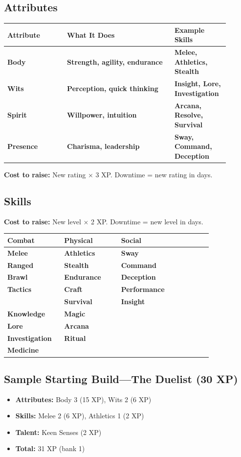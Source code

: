 \documentclass[10pt]{article}
\begin{document}
\subsection{Attributes}
\begin{coretable}[Attributes]
\begin{tabular}{>{\bfseries}p{0.25\linewidth} >{\bfseries}p{0.45\linewidth} >{\bfseries}p{0.2\linewidth}}
\toprule
\textbf{Attribute} & \textbf{What It Does} & \textbf{Example Skills} \\
\midrule
Body & Strength, agility, endurance & Melee, Athletics, Stealth \\
Wits & Perception, quick thinking & Insight, Lore, Investigation \\
Spirit & Willpower, intuition & Arcana, Resolve, Survival \\
Presence & Charisma, leadership & Sway, Command, Deception \\
\bottomrule
\end{tabular}
\end{coretable}
\textbf{Cost to raise:} New rating $\times$ 3 XP. Downtime = new rating in days.

\subsection{Skills}
\textbf{Cost to raise:} New level $\times$ 2 XP. Downtime = new level in days.
\begin{coretable}
\begin{tabular}{>{\bfseries}p{0.25\linewidth} >{\bfseries}p{0.25\linewidth} >{\bfseries}p{0.4\linewidth}}
\toprule
\textbf{Combat} & \textbf{Physical} & \textbf{Social} \\
\midrule
Melee & Athletics & Sway \\
Ranged & Stealth & Command \\
Brawl & Endurance & Deception \\
Tactics & Craft & Performance \\
& Survival & Insight \\
\addlinespace
\textbf{Knowledge} & \textbf{Magic} & \\
Lore & Arcana & \\
Investigation & Ritual & \\
Medicine & & \\
\bottomrule
\end{tabular}
\end{coretable}

\subsection{Sample Starting Build—The Duelist (30 XP)}
\begin{itemize}[leftmargin=*]
    \item \textbf{Attributes:} Body 3 (15 XP), Wits 2 (6 XP)
    \item \textbf{Skills:} Melee 2 (6 XP), Athletics 1 (2 XP)
    \item \textbf{Talent:} Keen Senses (2 XP)
    \item \textbf{Total:} 31 XP (bank 1)
\end{itemize}
\end{document}
